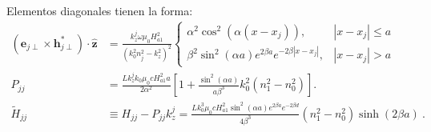Elementos diagonales tienen la forma:
\begin{align*}
	\left(\textbf{e}_{j\perp}\times\textbf{h}_{j\perp}^*\right)\cdot \hat{\textbf{z}}&=\frac{k_z^j\omega\mu_0 H_{a1}^2}{(k_0^2n_j^2-k_z^2)^2} \left\{ \begin{matrix}
\alpha^2\cos^2(\alpha (x-x_j)), & |x-x_j| \le a
\\
\beta^2 \sin^2(\alpha a) e^{2\beta a} e^{-2\beta|x-x_j|}, & |x-x_j|>a
\end{matrix}\right.
\\
	P_{jj} &= \frac{L k_z^j  k_0 \mu_0 c H_{a1}^2  a}{2 \alpha^2} \left[1 + \frac{\sin^2(\alpha a)}{a \beta^3 } k_0^2 \left( n_1^2 - n_0^2 \right) \right].
\\
	\tilde{H}_{jj} &\equiv H_{jj} - P_{jj} k_z^j =
	\frac{L k_0^3  \mu_0 c H_{a1}^2 \sin^2(\alpha a)e^{2\beta a}e^{-2\beta d}}{4 \beta^3 } (n_1^2-n_0^2) \sinh(2\beta a) \ .
\end{align*}

